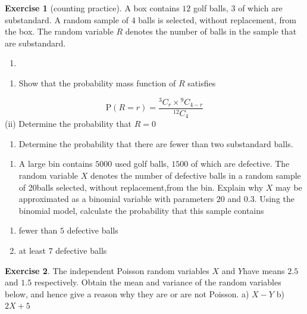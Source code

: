 \documentclass[
]{book}
\providecommand{\tightlist}{%
  \setlength{\itemsep}{0pt}\setlength{\parskip}{0pt}}
\theoremstyle{definition}
\theoremstyle{definition}
\theoremstyle{definition}
\newtheorem{exercise}{Exercise}[chapter]
\theoremstyle{definition}
\theoremstyle{remark}
\begin{document}
\begin{exercise}[counting practice]

A box contains \(12\) golf balls, \(3\) of which are substandard. A random sample of \(4\) balls is selected, without replacement, from the box. The random variable \(R\) denotes the number of balls in the sample that are substandard.

\begin{enumerate}
\def\labelenumi{\alph{enumi})}
\item
\end{enumerate}

\begin{enumerate}
\def\labelenumi{(\roman{enumi})}
\tightlist
\item
  Show that the probability mass function of \(R\) satisfies
\end{enumerate}

\[\text{P}(R=r) = \frac{{}^3C_r \times {}^9C_{4-r}}{^{12}C_{4}} \]
(ii) Determine the probability that \(R=0\)

\begin{enumerate}
\def\labelenumi{(\roman{enumi})}
\setcounter{enumi}{2}
\tightlist
\item
  Determine the probability that there are fewer than two substandard balls.
\end{enumerate}

\begin{enumerate}
\def\labelenumi{\alph{enumi})}
\setcounter{enumi}{1}
\tightlist
\item
  A large bin contains \(5000\) used golf balls, \(1500\) of which are defective. The random variable \(X\) denotes the number of defective balls in a random sample of 20balls selected, without replacement,from the bin. Explain why \(X\) may be approximated as a binomial variable with parameters \(20\) and \(0.3\). Using the binomial model, calculate the probability that this sample contains
\end{enumerate}

\begin{enumerate}
\def\labelenumi{(\roman{enumi})}
\item
  fewer than \(5\) defective balls
\item
  at least \(7\) defective balls
\end{enumerate}

\end{exercise}

\begin{exercise}
The independent Poisson random variables \(X\) and \(Y\)have means \(2.5\) and \(1.5\) respectively. Obtain the mean and variance of the random variables below, and hence give a reason why they are or are not Poisson.
a) \(X-Y\)
b) \(2X+5\)
\end{exercise}

  
\end{document}

